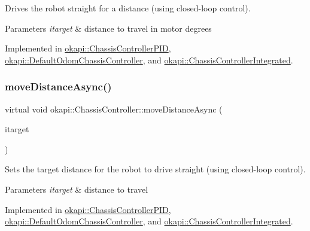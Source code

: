 Drives the robot straight for a distance (using closed-\/loop control).


\begin{DoxyParams}{Parameters}
{\em itarget} & distance to travel in motor degrees \\
\hline
\end{DoxyParams}


Implemented in \mbox{\hyperlink{classokapi_1_1ChassisControllerPID_a711b80afa09a80233372cc37267606d5}{okapi\+::\+Chassis\+Controller\+P\+ID}}, \mbox{\hyperlink{classokapi_1_1DefaultOdomChassisController_a42abd53b9a0b96b722186ada8eb13d98}{okapi\+::\+Default\+Odom\+Chassis\+Controller}}, and \mbox{\hyperlink{classokapi_1_1ChassisControllerIntegrated_ab0361bc7bb5dc0b4ac4c990c1b9dd14f}{okapi\+::\+Chassis\+Controller\+Integrated}}.

\mbox{\label{classokapi_1_1ChassisController_a67a17268b871a4f1ae74d67891cbf5dd}} 
\subsubsection{\texorpdfstring{moveDistanceAsync()}{moveDistanceAsync()}\hspace{0.1cm}{\footnotesize\ttfamily [1/2]}}
{\footnotesize\ttfamily virtual void okapi\+::\+Chassis\+Controller\+::move\+Distance\+Async (\begin{DoxyParamCaption}\item[{Q\+Length}]{itarget }\end{DoxyParamCaption})\hspace{0.3cm}{\ttfamily [pure virtual]}}

Sets the target distance for the robot to drive straight (using closed-\/loop control).


\begin{DoxyParams}{Parameters}
{\em itarget} & distance to travel \\
\hline
\end{DoxyParams}


Implemented in \mbox{\hyperlink{classokapi_1_1ChassisControllerPID_affad4aa1b0bd54db728ac600493a6c4c}{okapi\+::\+Chassis\+Controller\+P\+ID}}, \mbox{\hyperlink{classokapi_1_1DefaultOdomChassisController_a61ca0d303fcbfd08932157af9adbbb12}{okapi\+::\+Default\+Odom\+Chassis\+Controller}}, and \mbox{\hyperlink{classokapi_1_1ChassisControllerIntegrated_afc97bc450a090d91b57bc6353b4a6972}{okapi\+::\+Chassis\+Controller\+Integrated}}.

